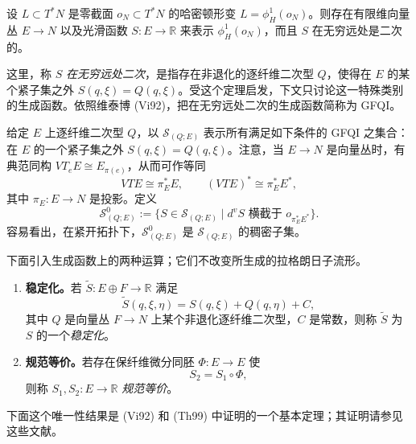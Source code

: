 \begin{theorem}\label{thm:laudenbach-sikorav-gfqi}
设 $L\subset T^*N$ 是零截面 $o_N\subset T^*N$ 的哈密顿形变
$L=\phi_H^1(o_N)$。则存在有限维向量丛 $E\to N$ 以及光滑函数
$S:E\to\mathbb R$ 来表示 $\phi_H^1(o_N)$，而且 $S$ 在无穷远处是二次的。
\end{theorem}

这里，称 $S$ \emph{在无穷远处二次}，是指存在非退化的逐纤维二次型 $Q$，使得在 $E$ 的某个紧子集之外
$S(q,\xi)=Q(q,\xi)$。受这个定理启发，下文只讨论这一特殊类别的生成函数。依照维泰博 (Vi92)，把在无穷远处二次的生成函数简称为 GFQI。

给定 $E$ 上逐纤维二次型 $Q$，以 $\mathcal S_{(Q;E)}$ 表示所有满足如下条件的 GFQI 之集合：在 $E$ 的一个紧子集之外
$S(q,\xi)=Q(q,\xi)$。注意，当 $E\to N$ 是向量丛时，有典范同构
$VT_eE\cong E_{\pi(e)}$，从而可作等同
\[
 VTE\cong\pi_E^*E,
 \qquad
 (VTE)^*\cong\pi_E^*E^*,
\]
其中 $\pi_E:E\to N$ 是投影。定义
\[
 \mathcal S^0_{(Q;E)}
 :=\{S\in\mathcal S_{(Q;E)}\mid
 d^vS\text{ 横截于 }o_{\pi_E^*E^*}\}.
\]
容易看出，在紧开拓扑下，$\mathcal S^0_{(Q;E)}$ 是
$\mathcal S_{(Q;E)}$ 的稠密子集。

下面引入生成函数上的两种运算；它们不改变所生成的拉格朗日子流形。

\begin{definition}\label{def:generating-function-equivalences}
\begin{enumerate}[label=(\arabic*)]
\item \textbf{稳定化。}若
$\widetilde S:E\oplus F\to\mathbb R$ 满足
\[
 \widetilde S(q,\xi,\eta)=S(q,\xi)+Q(q,\eta)+C,
\]
其中 $Q$ 是向量丛 $F\to N$ 上某个非退化逐纤维二次型，$C$ 是常数，则称
$\widetilde S$ 为 $S$ 的一个\emph{稳定化}。

\item \textbf{规范等价。}若存在保纤维微分同胚 $\Phi:E\to E$ 使
\[
 S_2=S_1\circ\Phi,
\]
则称 $S_1,S_2:E\to\mathbb R$ \emph{规范等价}。
\end{enumerate}
\end{definition}

下面这个唯一性结果是 (Vi92) 和 (Th99) 中证明的一个基本定理；其证明请参见这些文献。

